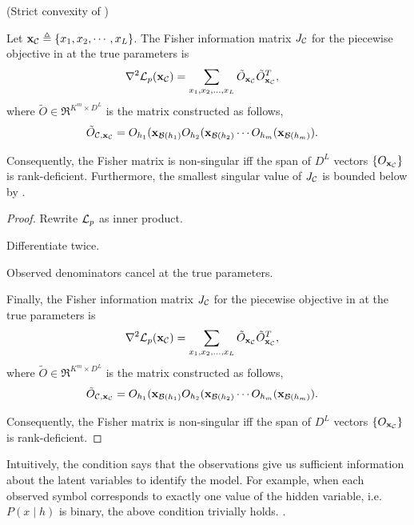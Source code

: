   \begin{lemma} (Strict convexity of )
  \label{lem:hessian}

  Let $\mathbf{x}_{\mathcal{C}} \triangleq\{x_1, x_2, \cdots, x_L\}$. The Fisher information
  matrix $J_{\mathcal{C}}$ for the piecewise objective in  at the
  true parameters is 
  \begin{align}
    \nabla^2 \mathcal{L}_p(\mathbf{x}_{\mathcal{C}}) 
    &= \sum_{x_1, x_2, \ldots, x_L} \tilde O_{\mathbf{x}_{\mathcal{C}}} \tilde O_{\mathbf{x}_{\mathcal{C}}}^T,
  \end{align}
  where $\tilde O \in \Re^{K^m \times D^L}$ is the matrix constructed as follows,
  \begin{align}
    \tilde O_{\mathcal{C}, \mathbf{x}_{\mathcal{C}}} &= O_{h_1}(\mathbf{x}_{\mathcal{B}(h_1)} O_{h_2}(\mathbf{x}_{\mathcal{B}(h_2)} \cdots O_{h_m}(\mathbf{x}_{\mathcal{B}(h_m)}).
  \end{align}

  Consequently, the Fisher matrix is non-singular iff the span of $D^L$ vectors $\{ O_{\mathbf{x}_{\mathcal{C}}} \}$ is rank-deficient.
  Furthermore, the smallest singular value of $J_{\mathcal{C}}$ is bounded below
    by .
\end{lemma}
\begin{proof}
  Rewrite $\mathcal{L}_p$ as inner product.

  Differentiate twice.

  Observed denominators cancel at the true parameters.

  Finally, the Fisher information matrix $J_{\mathcal{C}}$ for the piecewise
  objective in  at the true parameters is 
  \begin{align}
    \nabla^2 \mathcal{L}_p(\mathbf{x}_{\mathcal{C}}) 
    &= \sum_{x_1, x_2, \ldots, x_L} \tilde O_{\mathbf{x}_{\mathcal{C}}} \tilde O_{\mathbf{x}_{\mathcal{C}}}^T,
  \end{align}
  where $\tilde O \in \Re^{K^m \times D^L}$ is the matrix constructed as follows,
  \begin{align}
    \tilde O_{\mathcal{C}, \mathbf{x}_{\mathcal{C}}} &= O_{h_1}(\mathbf{x}_{\mathcal{B}(h_1)} O_{h_2}(\mathbf{x}_{\mathcal{B}(h_2)} \cdots O_{h_m}(\mathbf{x}_{\mathcal{B}(h_m)}).
  \end{align}

  Consequently, the Fisher matrix is non-singular iff the span of $D^L$
    vectors $\{ O_{\mathbf{x}_{\mathcal{C}}} \}$ is rank-deficient.
\end{proof}

Intuitively, the condition  says that the observations give
  us sufficient information about the latent variables to identify the
  model. 
For example, when each observed symbol corresponds to exactly one value
  of the hidden variable, i.e. $P(x \mid h )$ is binary, the above
  condition trivially holds\verify.
.

